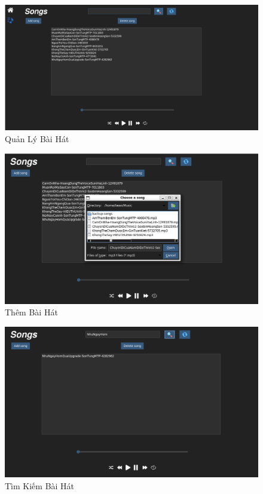 \documentclass[a4paper]{article}
\begin{document}
\begin{figure}[H]
    \centering
    \includegraphics[width=1.0\textwidth]{quanlysong.PNG}
    \caption{Quản Lý Bài Hát}
    \label{fig:example_image}
\end{figure}

\begin{figure}[H]
    \centering
    \includegraphics[width=1.0\textwidth]{addsongs.PNG}
    \caption{Thêm Bài Hát}
    \label{fig:example_image}
\end{figure}

\begin{figure}[H]
    \centering
    \includegraphics[width=1.0\textwidth]{searchsong.PNG}
    \caption{Tìm Kiếm Bài Hát}
    \label{fig:example_image}
\end{figure}
\end{document}
